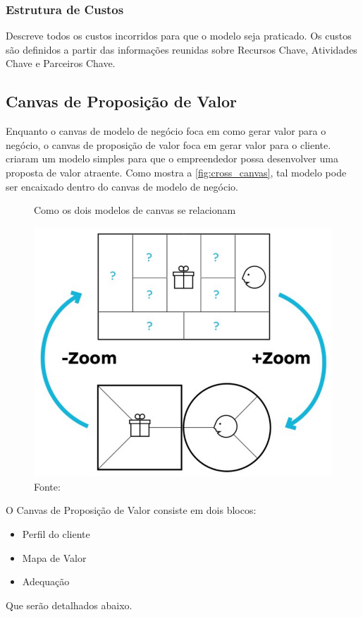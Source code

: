 \subsubsection{Estrutura de Custos}
\label{cha:estrutura_de_custos}
Descreve todos os custos incorridos para que o modelo seja praticado. Os custos são definidos a partir das informações reunidas sobre Recursos Chave, Atividades Chave e Parceiros Chave. \cite{businessmodel}

\subsection{Canvas de Proposição de Valor}
\label{cha:canvas_de_proposicao_de_valor}
Enquanto o canvas de modelo de negócio foca em como gerar valor para o negócio, o canvas de proposição de valor foca em gerar valor para o cliente.
 criaram um modelo simples para que o empreendedor possa desenvolver uma proposta de valor atraente. Como mostra a \autoref{fig:cross_canvas}, tal modelo pode ser encaixado dentro do canvas de modelo de negócio. 

\begin{figure}[H]
\caption{Como os dois modelos de canvas se relacionam}
\centerline{\includegraphics[scale=0.25]{img/cross_canvas}}
\label{fig:cross_canvas}
\caption* {Fonte: }
\end{figure}

O Canvas de Proposição de Valor consiste em dois blocos:
\begin{itemize}
\item Perfil do cliente
\item Mapa de Valor
\item Adequação
\end{itemize}
Que serão detalhados abaixo.

